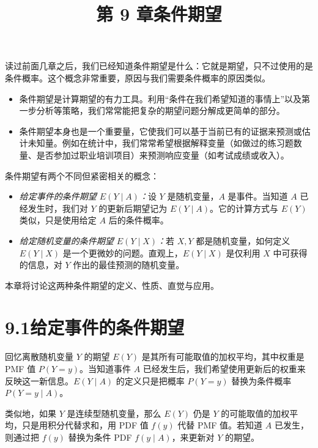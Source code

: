 \documentclass[UTF8,12pt,a4paper,fontset=fandol]{ctexart}
\title{第 9 章\quad 条件期望}
\author{}
\date{}
\begin{document}
\maketitle

读过前面几章之后，我们已经知道条件期望是什么：它就是期望，只不过使用的是条件概率。这个概念非常重要，原因与我们需要条件概率的原因类似。

\begin{itemize}
  \item 条件期望是计算期望的有力工具。利用“条件在我们希望知道的事情上”以及第一步分析等策略，我们常常能把复杂的期望问题分解成更简单的部分。

  \item 条件期望本身也是一个重要量，它使我们可以基于当前已有的证据来预测或估计未知量。例如在统计中，我们常常希望根据解释变量（如做过的练习题数量、是否参加过职业培训项目）来预测响应变量（如考试成绩或收入）。
\end{itemize}

条件期望有两个不同但紧密相关的概念：

\begin{itemize}
  \item \textit{给定事件的条件期望 $E(Y\mid A)$：}设 $Y$ 是随机变量，$A$ 是事件。当知道 $A$ 已经发生时，我们对 $Y$ 的更新后期望记为 $E(Y\mid A)$。它的计算方式与 $E(Y)$ 类似，只是使用给定 $A$ 后的条件概率。

  \item \textit{给定随机变量的条件期望 $E(Y\mid X)$：}若 $X,Y$ 都是随机变量，如何定义 $E(Y\mid X)$ 是一个更微妙的问题。直观上，$E(Y\mid X)$ 是仅利用 $X$ 中可获得的信息，对 $Y$ 作出的最佳预测的随机变量。
\end{itemize}

本章将讨论这两种条件期望的定义、性质、直觉与应用。

\section*{9.1\quad 给定事件的条件期望}

回忆离散随机变量 $Y$ 的期望 $E(Y)$ 是其所有可能取值的加权平均，其中权重是 PMF 值 $P(Y=y)$。当知道事件 $A$ 已经发生后，我们希望使用更新后的权重来反映这一新信息。$E(Y\mid A)$ 的定义只是把概率 $P(Y=y)$ 替换为条件概率 $P(Y=y\mid A)$。

类似地，如果 $Y$ 是连续型随机变量，那么 $E(Y)$ 仍是 $Y$ 的可能取值的加权平均，只是用积分代替求和，用 PDF 值 $f(y)$ 代替 PMF 值。若知道 $A$ 已发生，则通过把 $f(y)$ 替换为条件 PDF $f(y\mid A)$，来更新对 $Y$ 的期望。
\end{document}
